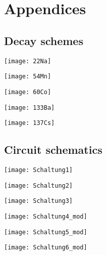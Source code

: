 \section{Appendices}
%
\subsection{Decay schemes}
%
\begin{multicolfloat}
\texttt{[image: 22Na]}
\label{fig:22NaDecayScheme}
\end{multicolfloat}
%
\begin{multicolfloat}
\texttt{[image: 54Mn]}
\label{fig:54MnDecayScheme}
\end{multicolfloat}
%
\begin{multicolfloat}
\texttt{[image: 60Co]}
\label{fig:60CoDecayScheme}
\end{multicolfloat}
%
\begin{multicolfloat}
\texttt{[image: 133Ba]}
\label{fig:133BaDecayScheme}
\end{multicolfloat}
%
\begin{multicolfloat}
\texttt{[image: 137Cs]}
\label{fig:137CsDecayScheme}
\end{multicolfloat}
%
\subsection{Circuit schematics}
%
\begin{multicolfloat}
\texttt{[image: Schaltung1]}
\label{fig:Schaltung1}
\end{multicolfloat}
%
\begin{multicolfloat}
\texttt{[image: Schaltung2]}
\label{fig:Schaltung2}
\end{multicolfloat}
%
\begin{multicolfloat}
\texttt{[image: Schaltung3]}
\label{fig:Schaltung3}
\end{multicolfloat}
%
\begin{multicolfloat}
\texttt{[image: Schaltung4\_mod]}
\label{fig:Schaltung4}
\end{multicolfloat}
%
\begin{multicolfloat}
\texttt{[image: Schaltung5\_mod]}
\label{fig:Schaltung5}
\end{multicolfloat}
%
\begin{multicolfloat}
\texttt{[image: Schaltung6\_mod]}
\label{fig:Schaltung6}
\end{multicolfloat}
